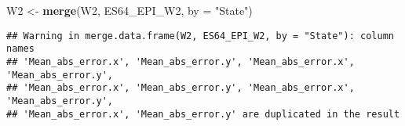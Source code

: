 \documentclass[
]{article}
\newenvironment{Shaded}{\begin{snugshade}}{\end{snugshade}}
\newcommand{\AttributeTok}[1]{\textcolor[rgb]{0.13,0.29,0.53}{#1}}
\newcommand{\FunctionTok}[1]{\textcolor[rgb]{0.13,0.29,0.53}{\textbf{#1}}}
\newcommand{\NormalTok}[1]{#1}
\newcommand{\OtherTok}[1]{\textcolor[rgb]{0.56,0.35,0.01}{#1}}
\newcommand{\StringTok}[1]{\textcolor[rgb]{0.31,0.60,0.02}{#1}}
\begin{document}
\begin{Shaded}
\begin{Highlighting}[]
\NormalTok{W2 }\OtherTok{\textless{}{-}} \FunctionTok{merge}\NormalTok{(W2, ES64\_EPI\_W2, }\AttributeTok{by =} \StringTok{"State"}\NormalTok{)}
\end{Highlighting}
\end{Shaded}

\begin{verbatim}
## Warning in merge.data.frame(W2, ES64_EPI_W2, by = "State"): column names
## 'Mean_abs_error.x', 'Mean_abs_error.y', 'Mean_abs_error.x', 'Mean_abs_error.y',
## 'Mean_abs_error.x', 'Mean_abs_error.y', 'Mean_abs_error.x', 'Mean_abs_error.y',
## 'Mean_abs_error.x', 'Mean_abs_error.y' are duplicated in the result
\end{verbatim}
\end{document}
